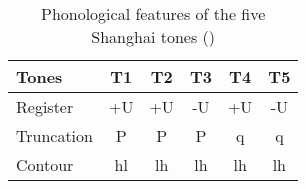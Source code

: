 \documentclass[11pt]{article}
\begin{document}
\begin{table}[h!]
	\centering
	\caption{Phonological features of the five Shanghai tones (\citep{zhu1999shanghai})} 
	\begin{tabular}{lccccc}
		\toprule
		\textbf{Tones} & \textbf{T1} & \textbf{T2} & \textbf{T3} & \textbf{T4} & \textbf{T5} \\
		\midrule
		Register   & +U & +U & -U & +U & -U \\
		Truncation & P  & P  & P  & q  & q  \\
		Contour    & hl & lh & lh & lh & lh \\
		\bottomrule
	\end{tabular}
\end{table}






\end{document}
